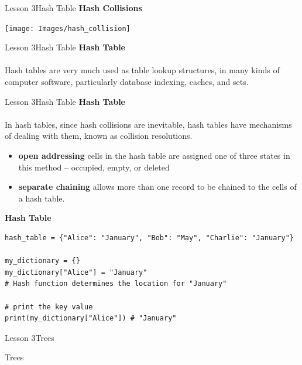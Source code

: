 \documentclass[aspectratio=1610]{beamer}
\begin{document}
\begin{frame}{Lesson 3}{Hash Table}
\LARGE
\textbf{Hash Collisions}\\
\begin{center}
\texttt{[image: Images/hash\_collision]}
\end{center}
\end{frame}


\begin{frame}{Lesson 3}{Hash Table}
\LARGE
\textbf{Hash Table}\\~\\
Hash tables are very much used as table lookup structures, in many kinds of
computer software, particularly database indexing, caches, and sets.
\end{frame}


\begin{frame}{Lesson 3}{Hash Table}
\LARGE
\textbf{Hash Table}\\~\\
In hash tables, since hash collisions are inevitable, hash tables have mechanisms
of dealing with them, known as collision resolutions. 
\Large
\begin{itemize}
	\item \textbf{open addressing} cells in the hash table are assigned one of three states in this method – occupied, empty, or deleted
	\item \textbf{separate chaining} allows more than one record to be chained to the cells of a hash table.
\end{itemize}
\end{frame}


\begin{frame}[fragile]
\Large
\textbf{Hash Table}\\
\begin{lstlisting}
hash_table = {"Alice": "January", "Bob": "May", "Charlie": "January"}

my_dictionary = {}
my_dictionary["Alice"] = "January" 
# Hash function determines the location for "January"

# print the key value
print(my_dictionary["Alice"]) # "January"
\end{lstlisting}
\end{frame}



\begin{frame}{Lesson 3}{Trees}
\begin{center}
\Huge Trees
\end{center}
\end{frame}
\end{document}
